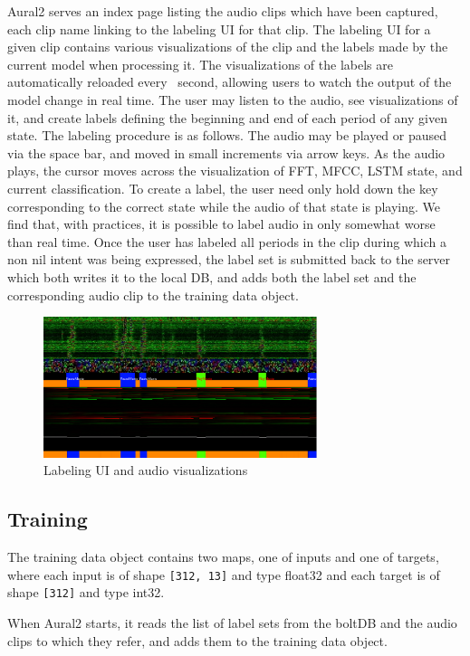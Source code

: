 \documentclass[conference]{IEEEtran}
\begin{document}
Aural2 serves an index page listing the audio clips which have been captured, each clip name linking to the labeling UI for that clip.
The labeling UI for a given clip contains various visualizations of the clip and the labels made by the current model when processing it.
The visualizations of the labels are automatically reloaded every ~second, allowing users to watch the output of the model change in real time.
The user may listen to the audio, see visualizations of it, and create labels defining the beginning and end of each period of any given state.
The labeling procedure is as follows.
The audio may be played or paused via the space bar, and moved in small increments via arrow keys.
As the audio plays, the cursor moves across the visualization of FFT, MFCC, LSTM state, and current classification.
To create a label, the user need only hold down the key corresponding to the correct state while the audio of that state is playing.
We find that, with practices, it is possible to label audio in only somewhat worse than real time.
Once the user has labeled all periods in the clip during which a non nil intent was being expressed,
the label set is submitted back to the server which both writes it to the local DB,
and adds both the label set and the corresponding audio clip to the training data object.

\begin{figure}[htbp]
\centerline{\includegraphics[width=80mm]{labeling_ui.png}}
\caption{Labeling UI and audio visualizations}
\label{fig}
\end{figure}

\subsection{Training}
The training data object contains two maps, one of inputs and one of
targets, where each input is of shape \texttt{[312, 13]} and type float32 and
each target is of shape \texttt{[312]} and type int32.

When Aural2 starts, it reads the list of label sets from the boltDB and
the audio clips to which they refer, and adds them to the training data
object.
\end{document}
